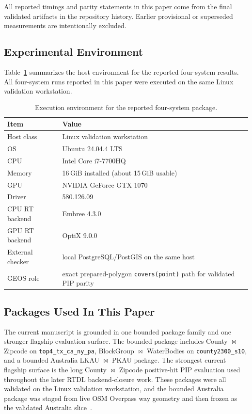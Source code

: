 \documentclass[conference]{IEEEtran}
\begin{document}
All reported timings and parity statements in this paper come from the final
validated artifacts in the repository history. Earlier provisional or
superseded measurements are intentionally excluded.

\subsection{Experimental Environment}

Table~\ref{tab:environment} summarizes the host environment for the reported
four-system results. All four-system runs reported in this paper were executed
on the same Linux validation workstation.

\begin{table}[t]
\caption{Execution environment for the reported four-system package.}
\label{tab:environment}
\centering
\begin{tabular}{p{}p{}}
\toprule
Item & Value \\
\midrule
Host class & Linux validation workstation \\
OS & Ubuntu 24.04.4 LTS \\
CPU & Intel Core i7-7700HQ \\
Memory & 16\,GiB installed (about 15\,GiB usable) \\
GPU & NVIDIA GeForce GTX 1070 \\
Driver & 580.126.09 \\
CPU RT backend & Embree 4.3.0 \\
GPU RT backend & OptiX 9.0.0 \\
External checker & local PostgreSQL/PostGIS on the same host \\
GEOS role & exact prepared-polygon \texttt{covers(point)} path for validated PIP parity \\
\bottomrule
\end{tabular}
\end{table}

\subsection{Packages Used In This Paper}

The current manuscript is grounded in one bounded package family and one
stronger flagship evaluation surface. The bounded package includes County
$\bowtie$ Zipcode on \texttt{top4\_tx\_ca\_ny\_pa}, BlockGroup $\bowtie$
WaterBodies on \texttt{county2300\_s10}, and a bounded Australia
LKAU $\bowtie$ PKAU package. The strongest current flagship surface is the long
County $\bowtie$ Zipcode positive-hit PIP evaluation used throughout the later
RTDL backend-closure work. These packages were all validated on the Linux
validation workstation, and the bounded Australia package was staged from live
OSM Overpass way geometry and then frozen as the validated Australia
slice~\cite{overpass}.
\end{document}
